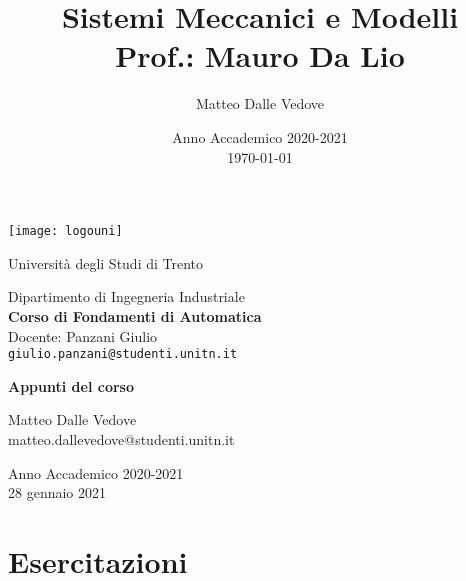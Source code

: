 \documentclass[10pt,a4paper,openright]{report}
\title{Sistemi Meccanici e Modelli \\ Prof.: Mauro Da Lio}
\author{Matteo Dalle Vedove}
\date{Anno Accademico 2020-2021 \\ \today}
\begin{document}
	
	\makeatletter
	\begin{center}
		\vspace{3cm}
		\thispagestyle{empty}
		\texttt{[image: logouni]}
		
		\vspace{2cm}
		
		{\Large Università degli Studi di Trento}
		
		\vspace{2cm}
		{\Large Dipartimento di Ingegneria Industriale} \\ \vspace{2mm}
		{\LARGE \textbf{Corso di Fondamenti di Automatica}} \\ \vspace{2mm}
		{\Large Docente: Panzani Giulio}\\
		\texttt{giulio.panzani@studenti.unitn.it}
		
		\vspace{2cm}
		{\LARGE \textbf{Appunti del corso}}
		
		\vspace{2cm}
		{\large 
			Matteo Dalle Vedove \\
			matteo.dallevedove@studenti.unitn.it
			
			\vspace{2cm}
			Anno Accademico 2020-2021 \\ 28 gennaio 2021}
	\end{center}
	
	\tableofcontents
	
	
%	
%	
	
	
	\chapter{Esercitazioni}
%	
	
\end{document}
